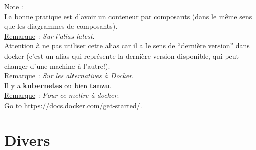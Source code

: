 \documentclass[a4paper,12pt,twoside]{article}
\newcommand{\urlcolor}{magenta}  %
\newcommand{\keycolor}{purple} %
\newcommand{\rem}[2]{\noindent\underline{Remarque} : \textit{#1}.\\ \indent #2}
\newcommand{\note}[1]{\noindent\underline{Note} : \\ \indent #1}
\newcommand{\keyref}[2]{\hypersetup{urlcolor=\keycolor} \href{#1}{\textbf{#2}}\hypersetup{urlcolor=\urlcolor}}
\begin{document}
\note{La bonne pratique est d'avoir un conteneur par composants (dans le même sens que les diagrammes de composants).}\\

\rem{Sur l'alias latest}{Attention à ne pas utiliser cette alias car il a le sens de ``dernière version'' dans docker (c'est un alias qui représente la dernière version disponible, qui peut changer d'une machine à l'autre!).}\\

\rem{Sur les alternatives à Docker}{Il y a \keyref{https://kubernetes.io/fr/}{kubernetes} ou bien \keyref{https://tanzu.vmware.com/tanzu}{tanzu}.}\\

\rem{Pour ce mettre à docker}{Go to \url{https://docs.docker.com/get-started/}.}\\

\section{Divers}



\end{document}
